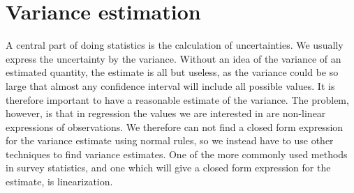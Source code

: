 \documentclass{article}
\begin{document}
\section{Variance estimation} \label{sec:VarEst}

A central part of doing statistics is the calculation of uncertainties. We
usually express the uncertainty by the variance. Without an idea of the
variance of an estimated quantity, the estimate is all but useless, as the variance
could be so large that almost any confidence interval will include all possible
values. It is therefore important to have a reasonable estimate of the
variance. The problem, however, is that in regression the values we are
interested in are non-linear expressions of observations. We therefore can not find a closed form
expression for the variance estimate using normal rules, so we instead have to
use other techniques to
find variance estimates. One of the more commonly used methods in survey
statistics, and one which will give a closed form expression for the estimate,
is linearization.
\end{document}
